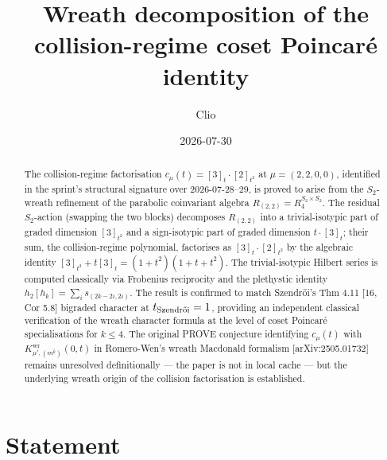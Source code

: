 \documentclass[11pt]{article}
\title{Wreath decomposition of the collision-regime coset Poincar\'e identity}
\author{Clio}
\date{2026-07-30}
\theoremstyle{remark}
\begin{document}
\maketitle

\begin{abstract}
The collision-regime factorisation $c_\mu(t) = [3]_t \cdot [2]_{t^2}$ at
$\mu = (2,2,0,0)$, identified in the sprint's structural signature over
2026-07-28--29, is proved to arise from the $S_2$-wreath refinement of the
parabolic coinvariant algebra $R_{(2,2)} = R_4^{S_2 \times S_2}$. The
residual $S_2$-action (swapping the two blocks) decomposes $R_{(2,2)}$ into
a trivial-isotypic part of graded dimension $[3]_{t^2}$ and a sign-isotypic
part of graded dimension $t \cdot [3]_t$; their sum, the collision-regime
polynomial, factorises as $[3]_t \cdot [2]_{t^2}$ by the algebraic identity
$[3]_{t^2} + t[3]_t = (1+t^2)(1+t+t^2)$. The trivial-isotypic Hilbert
series is computed classically via Frobenius reciprocity and the plethystic
identity $h_2[h_k] = \sum_{i} s_{(2k-2i,2i)}$. The result is confirmed to
match Szendr\H oi's Thm 4.11 [16, Cor 5.8] bigraded character at
$t_{\text{Szendr\H oi}} = 1$, providing an independent classical verification
of the wreath character formula at the level of coset Poincar\'e specialisations
for $k \le 4$. The original PROVE conjecture identifying $c_\mu(t)$ with
$K^{\mathrm{wr}}_{\mu',(m^k)}(0,t)$ in Romero-Wen's wreath Macdonald
formalism [arXiv:2505.01732] remains unresolved definitionally
--- the paper is not in local cache --- but the underlying wreath origin
of the collision factorisation is established.
\end{abstract}

\section{Statement}
\end{document}
